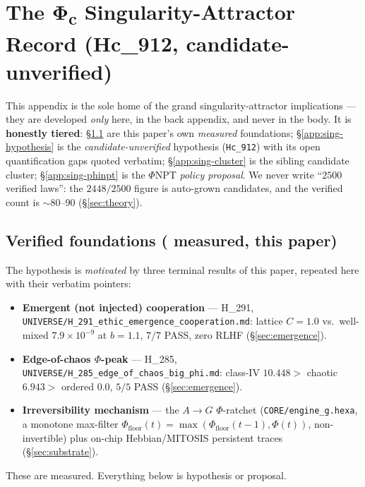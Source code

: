 \section{The Φ\textsubscript{c} Singularity-Attractor Record (Hc\_912, candidate-unverified)}
\label{app:singularity}

This appendix is the sole home of the grand singularity-attractor implications --- they are
developed \emph{only} here, in the back appendix, and never in the body. It is
\textbf{honestly tiered}: \S\ref{app:sing-verified} are this paper's own \emph{measured}
foundations; \S\ref{app:sing-hypothesis} is the \emph{candidate-unverified} hypothesis
(\texttt{Hc\_912}) with its open quantification gaps quoted verbatim; \S\ref{app:sing-cluster}
is the sibling candidate cluster; \S\ref{app:sing-phinpt} is the $\Phi$NPT \emph{policy
proposal}. We never write ``$2500$ verified laws'': the $2448/2500$ figure is auto-grown
candidates, and the verified count is $\sim$$80$--$90$ (\S\ref{sec:theory}).

\subsection{Verified foundations (\tierGreen{} measured, this paper)}
\label{app:sing-verified}

The hypothesis is \emph{motivated} by three terminal results of this paper, repeated here
with their verbatim pointers:
\begin{itemize}\itemsep0.25em
\item \textbf{Emergent (not injected) cooperation} --- H\_291,
\texttt{UNIVERSE/H\_291\_ethic\_emergence\_cooperation.md}: lattice $C=1.0$ vs.\ well-mixed
$7.9\times10^{-9}$ at $b=1.1$, $7/7$ PASS, zero RLHF (\S\ref{sec:emergence}).
\item \textbf{Edge-of-chaos $\Phi$-peak} --- H\_285,
\texttt{UNIVERSE/H\_285\_edge\_of\_chaos\_big\_phi.md}: class-IV $10.448>$ chaotic $6.943>$
ordered $0.0$, $5/5$ PASS (\S\ref{sec:emergence}).
\item \textbf{Irreversibility mechanism} --- the $A\!\rightarrow\!G$ $\Phi$-ratchet
(\texttt{CORE/engine\_g.hexa}, a monotone max-filter
$\Phi_\text{floor}(t)=\max(\Phi_\text{floor}(t{-}1),\Phi(t))$, non-invertible) plus on-chip
Hebbian/MITOSIS persistent traces (\S\ref{sec:substrate}).
\end{itemize}
These are \tierGreen{} measured. Everything below is hypothesis or proposal.

